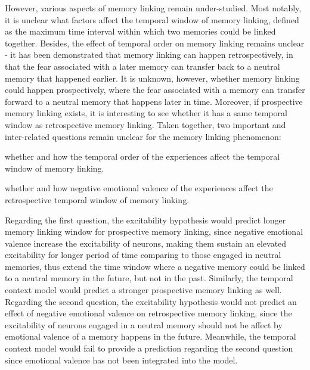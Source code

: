 \documentclass[master.tex]{subfiles}
\begin{document}
However, various aspects of memory linking remain under-studied. Most notably,
it is unclear what factors affect the temporal window of memory linking, defined
as the maximum time interval within which two memories could be linked together.
Besides, the effect of temporal order on memory linking remains unclear - it has
been demonstrated that memory linking can happen retrospectively, in that the
fear associated with a later memory can transfer back to a neutral memory that
happened earlier. It is unknown, however, whether memory linking could happen
prospectively, where the fear associated with a memory can transfer forward to a
neutral memory that happens later in time. Moreover, if prospective memory
linking exists, it is interesting to see whether it has a same temporal window
as retrospective memory linking. Taken together, two important and inter-related
questions remain unclear for the memory linking phenomenon:
\begin{inparaenum}[a)] \bfseries
\item whether and how the temporal order of the experiences affect the temporal
  window of memory linking.
\item whether and how negative emotional valence of the experiences affect the
  retrospective temporal window of memory linking.
\end{inparaenum}
Regarding the first question, the excitability hypothesis would predict longer
memory linking window for prospective memory linking, since negative emotional
valence increase the excitability of neurons, making them sustain an elevated
excitability for longer period of time comparing to those engaged in neutral
memories, thus extend the time window where a negative memory could be linked to
a neutral memory in the future, but not in the past. Similarly, the temporal
context model would predict a stronger prospective memory linking as well.
Regarding the second question, the excitability hypothesis would not predict an
effect of negative emotional valence on retrospective memory linking, since the
excitability of neurons engaged in a neutral memory should not be affect by
emotional valence of a memory happens in the future. Meanwhile, the temporal
context model would fail to provide a prediction regarding the second question
since emotional valence has not been integrated into the model.
\end{document}
